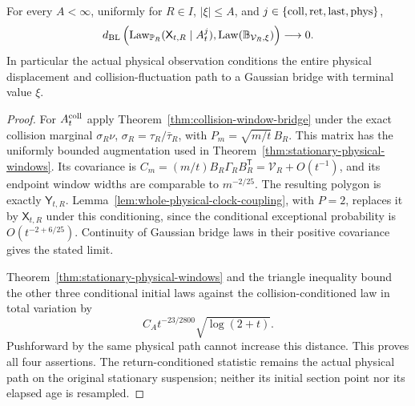\begin{theorem}
\label{thm:stationary-physical-bridge}
For every $A<\infty$, uniformly for $R\in I$, $|\xi|\le A$, and
$j\in\{{\rm coll},{\rm ret},{\rm last},{\rm phys}\}$,
\begin{equation}\label{eq:stationary-physical-bridge}
 d_{\rm BL}\left(\operatorname{Law}_{\mathbb P_R}
          (\mathsf X_{t,R}\mid A_t^j),
               \operatorname{Law}(\mathbb B_{\mathcal V_R,\xi})\right)
                                      \longrightarrow0.
\end{equation}
In particular the actual physical observation conditions the entire
physical displacement and collision-fluctuation path to a Gaussian
bridge with terminal value $\xi$.
\end{theorem}
\begin{proof}
For $A_t^{\rm coll}$ apply
Theorem~\ref{thm:collision-window-bridge} under the exact collision
marginal $\sigma_R\nu$, $\sigma_R=\tau_R/\bar\tau_R$, with
$P_m=\sqrt{m/t}\,B_R$. This matrix has the uniformly bounded
augmentation used in Theorem~\ref{thm:stationary-physical-windows}.
Its covariance is
$C_m=(m/t)B_R\Gamma_RB_R^{\mathsf T}=\mathcal V_R+O(t^{-1})$,
and its endpoint window widths are comparable to $m^{-2/25}$.
The resulting polygon is exactly $\mathsf Y_{t,R}$.
Lemma~\ref{lem:whole-physical-clock-coupling}, with $P=2$, replaces
it by $\mathsf X_{t,R}$ under this conditioning, since the conditional
exceptional probability is $O(t^{-2+6/25})$. Continuity of Gaussian
bridge laws in their positive covariance gives the stated limit.

Theorem~\ref{thm:stationary-physical-windows} and the triangle
inequality bound the other three conditional initial laws against the
collision-conditioned law in total variation by
\[
 C_A t^{-23/2800}\sqrt{\log(2+t)}.
\]
Pushforward by the same physical path cannot increase this distance. This proves all four assertions. The return-conditioned
statistic remains the actual physical path on the original stationary
suspension; neither its initial section point nor its elapsed age is
resampled.
\end{proof}

